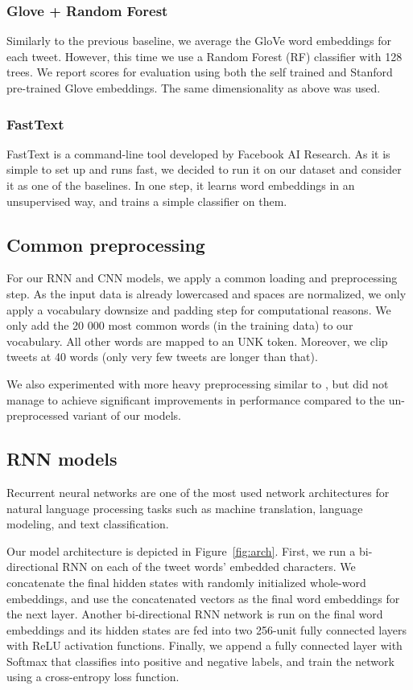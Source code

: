 \documentclass[10pt,conference,compsocconf]{IEEEtran}
\begin{document}
\subsubsection{Glove + Random Forest}
Similarly to the previous baseline, we average the GloVe word embeddings for each tweet. However, this time we use a Random Forest (RF) classifier \cite{random-forests} with 128 trees. We report scores for evaluation using both the self trained and Stanford pre-trained Glove embeddings. The same dimensionality as above was used.

\subsubsection{FastText}
FastText \cite{joulin2017bag} is a command-line tool developed by Facebook AI Research. As it is simple to set up and runs fast, we decided to run it on our dataset and consider it as one of the baselines. In one step, it learns word embeddings in an unsupervised way, and trains a simple classifier on them. 

\subsection{Common preprocessing}
For our RNN and CNN models, we apply a common loading and preprocessing step. As the input data is already lowercased and spaces are normalized, we only apply a vocabulary downsize and padding step for computational reasons.
We only add the 20 000 most common words (in the training data) to our vocabulary. All other words are mapped to an UNK token. Moreover, we clip tweets at 40 words (only very few tweets are longer than that).

We also experimented with more heavy preprocessing similar to \cite{twitter_preprocessing}, but did not manage to achieve significant improvements in performance compared to the un-preprocessed variant of our models.

\subsection{RNN models}
Recurrent neural networks are one of the most used network architectures for natural language processing tasks such as machine translation, language modeling, and text classification.

Our model architecture is depicted in Figure~\ref{fig:arch}. First, we run a bi-directional RNN on each of the tweet words' embedded characters. We concatenate the final hidden states with randomly initialized whole-word embeddings, and use the concatenated vectors as the final word embeddings for the next layer. Another bi-directional RNN network is run on the final word embeddings and its hidden states are fed into two 256-unit fully connected layers with ReLU activation functions. Finally, we append a fully connected layer with Softmax that classifies into positive and negative labels,
and train the network using a cross-entropy loss function. 
\end{document}
